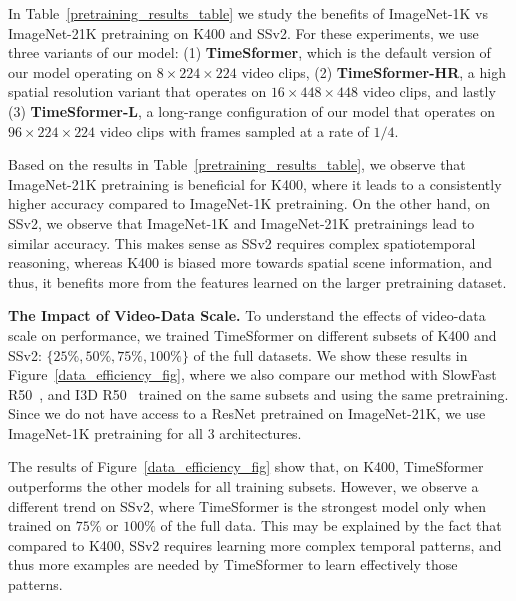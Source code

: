 \documentclass{article}
\begin{document}
In Table~\ref{pretraining_results_table} we study the benefits of ImageNet-1K vs ImageNet-21K pretraining on K400 and SSv2. For these experiments, we use three variants of our model: (1) \textbf{TimeSformer}, which is the default version of our model operating on $8 \times 224 \times 224$ video clips, (2) \textbf{TimeSformer-HR}, a high spatial resolution variant that operates on $16 \times 448 \times 448$ video clips, and lastly (3) \textbf{TimeSformer-L}, a long-range configuration of our model that operates on  $96 \times 224 \times 224$ video clips with frames sampled at a rate of $1/4$.




Based on the results in Table~\ref{pretraining_results_table}, we observe that ImageNet-21K pretraining is beneficial for K400, where it leads to a consistently higher accuracy compared to ImageNet-1K pretraining.  On the other hand, on SSv2, we observe that ImageNet-1K and ImageNet-21K pretrainings lead to similar accuracy. This makes sense as SSv2 requires complex spatiotemporal reasoning, whereas K400 is biased more towards spatial scene information, and thus, it benefits more from the features learned on the larger pretraining dataset.





\textbf{The Impact of Video-Data Scale.} To understand the effects of video-data scale on performance, we trained TimeSformer on different subsets of K400 and SSv2: $\{25\%, 50\%, 75\%, 100\%\}$ of the full datasets. We show these results in Figure~\ref{data_efficiency_fig}, where we also compare our method with SlowFast R50~\cite{slowfast}, and I3D R50~\cite{DBLP:conf/cvpr/CarreiraZ17} trained on the same subsets and using the same pretraining. Since we do not have access to a ResNet pretrained on ImageNet-21K, we use ImageNet-1K pretraining for all $3$ architectures.



The results of Figure~\ref{data_efficiency_fig} show that, on K400, TimeSformer outperforms the other models for all training subsets. However, we observe a different trend on SSv2, where TimeSformer is the strongest model only when trained on $75\%$ or $100\%$ of the full data. This may be explained by the fact that compared to K400, SSv2 requires learning more complex temporal patterns, and thus more examples are needed by TimeSformer to learn effectively those patterns.
\end{document}
